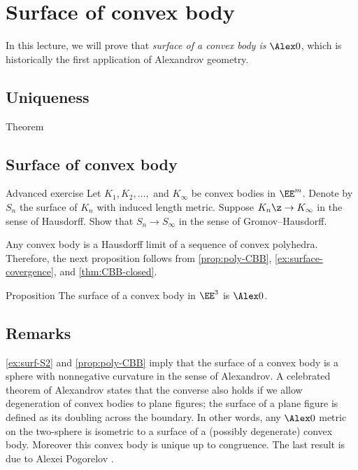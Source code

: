 \chapter{Surface of convex body}\label{chap:convex-body}

In this lecture, we will prove that \textit{surface of a convex body is $\Alex0$},
which is historically the first application of Alexandrov geometry.



\section{Uniqueness}

\begin{thm}{Theorem}

\end{thm}




\section{Surface of convex body}

\begin{thm}{Advanced exercise}\label{ex:surface-covergence}
Let $K_1,K_2,\dots,$ and $K_\infty$ be convex bodies in $\EE^m$.
Denote by $S_n$ the surface of $K_n$ with induced length metric.
Suppose $K_n\z\to K_\infty$ in the sense of Hausdorff.
Show that $S_n\to S_\infty$ in the sense of Gromov--Hausdorff.
\end{thm}

Any convex body is a Hausdorff limit of a sequence of convex polyhedra.
Therefore, the next proposition follows from \ref{prop:poly-CBB}, \ref{ex:surface-covergence}, and \ref{thm:CBB-closed}.

\begin{thm}{Proposition}\label{prop:conv-surf-CBB(0)}
The surface of a convex body in $\EE^3$ is $\Alex0$.
\end{thm}


\section{Remarks}

\ref{ex:surf-S2} and \ref{prop:poly-CBB} imply that the surface of a convex body is a sphere with nonnegative curvature in the sense of Alexandrov.
A celebrated theorem of Alexandrov states that the converse also holds if we allow degeneration of convex bodies to plane figures;
the surface of a plane figure is defined as its doubling across the boundary.
In other words, any $\Alex0$ metric on the two-sphere is isometric to a surface of a (possibly degenerate) convex body.
Moreover this convex body is unique up to congruence.
The last result is due to Alexei Pogorelov \cite{pogorelov}.


